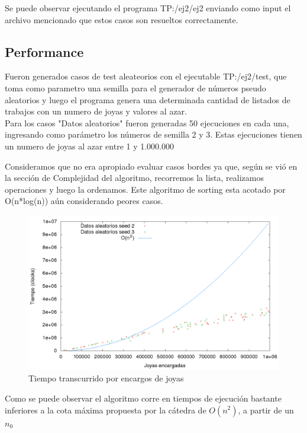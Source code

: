 Se puede observar ejecutando el programa TP:/ej2/ej2 enviando como input el archivo mencionado que estos casos son resueltos correctamente.

\subsection{Performance}

Fueron generados casos de test aleateorios con el ejecutable TP:/ej2/test, que toma como parametro una semilla para el generador de n\'umeros pseudo aleatorios y luego el programa genera una determinada cantidad de listados de trabajos con un numero de joyas y valores al azar.\\

Para los casos "Datos aleatorios" fueron generadas 50 ejecuciones en cada una, ingresando como par\'ametro los n\'umeros de semilla 2 y 3. Estas ejecuciones tienen un numero de joyas al azar entre 1 y 1.000.000

Consideramos que no era apropiado evaluar casos bordes ya que, seg\'un se vi\'o en la secci\'on de Complejidad del algoritmo, recorremos la lista, realizamos operaciones y luego la ordenamos. Este algoritmo de sorting esta acotado por O(n*log(n)) a\'un considerando peores casos.

\begin{center}
\begin{figure}[h]
\includegraphics[scale=0.4]{./img/ej2_chart2.png}
\caption{Tiempo transcurrido por encargos de joyas}
\end{figure}
\end{center}

Como se puede observar el algoritmo corre en tiempos de ejecuci\'on bastante inferiores a la cota m\'axima propuesta por la c\'atedra de $O(n^2)$, a partir de un $n_{0}$
